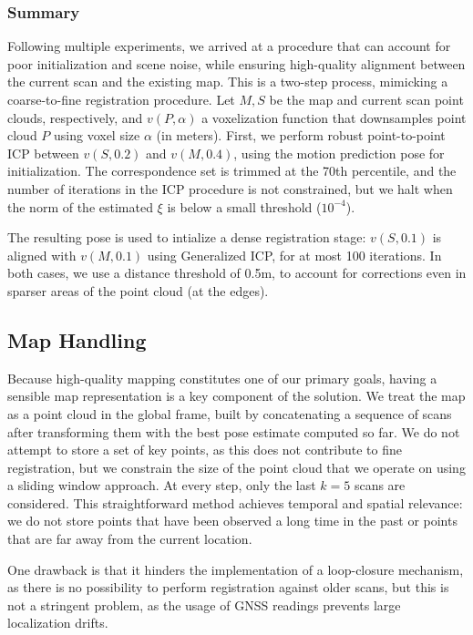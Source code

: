 \subsubsection{Summary}

Following multiple experiments, we arrived at a procedure that can account for poor initialization and scene noise, while ensuring high-quality alignment between the current scan and the existing map. This is a two-step process, mimicking a coarse-to-fine registration procedure. Let $M, S$ be the map and current scan point clouds, respectively, and $v(P, \alpha)$ a voxelization function that downsamples point cloud $P$ using voxel size $\alpha$ (in meters). First, we perform robust point-to-point ICP between $v(S, 0.2)$ and $v(M, 0.4)$, using the motion prediction pose for initialization. The correspondence set is trimmed at the 70th percentile, and the number of iterations in the ICP procedure is not constrained, but we halt when the norm of the estimated $\xi$ is below a small threshold ($10^{-4}$).

The resulting pose is used to intialize a dense registration stage: $v(S, 0.1)$ is aligned with $v(M, 0.1)$ using Generalized ICP, for at most 100 iterations. In both cases, we use a distance threshold of 0.5m, to account for corrections even in sparser areas of the point cloud (\eg at the edges).

\subsection{Map Handling}

Because high-quality mapping constitutes one of our primary goals, having a sensible map representation is a key component of the solution. We treat the map as a point cloud in the global frame, built by concatenating a sequence of scans after transforming them with the best pose estimate computed so far. We do not attempt to store a set of key points, as this does not contribute to fine registration, but we constrain the size of the point cloud that we operate on using a sliding window approach. At every step, only the last $k=5$ scans are considered. This straightforward method achieves temporal and spatial relevance: we do not store points that have been observed a long time in the past or points that are far away from the current location.

One drawback is that it hinders the implementation of a loop-closure mechanism, as there is no possibility to perform registration against older scans, but this is not a stringent problem, as the usage of GNSS readings prevents large localization drifts.

